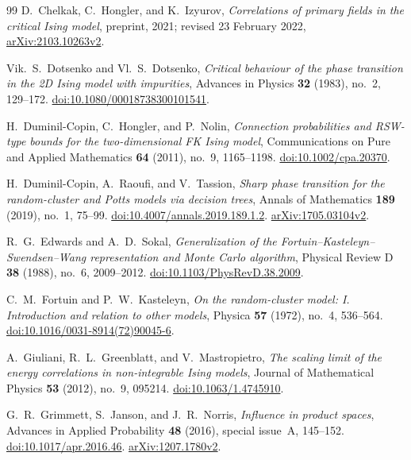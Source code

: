 \begin{thebibliography}{99}
D.~Chelkak, C.~Hongler, and K.~Izyurov,
\emph{Correlations of primary fields in the critical Ising model},
preprint, 2021; revised 23 February 2022,
\href{https://arxiv.org/abs/2103.10263v2}{arXiv:2103.10263v2}.

Vik.~S.~Dotsenko and Vl.~S.~Dotsenko,
\emph{Critical behaviour of the phase transition in the 2D Ising model
with impurities},
Advances in Physics \textbf{32} (1983), no.~2, 129--172.
\href{https://doi.org/10.1080/00018738300101541}{doi:10.1080/00018738300101541}.

H.~Duminil-Copin, C.~Hongler, and P.~Nolin,
\emph{Connection probabilities and RSW-type bounds for the
two-dimensional FK Ising model},
Communications on Pure and Applied Mathematics \textbf{64} (2011),
no.~9, 1165--1198.
\href{https://doi.org/10.1002/cpa.20370}{doi:10.1002/cpa.20370}.

H.~Duminil-Copin, A.~Raoufi, and V.~Tassion,
\emph{Sharp phase transition for the random-cluster and Potts models
via decision trees},
Annals of Mathematics \textbf{189} (2019), no.~1, 75--99.
\href{https://doi.org/10.4007/annals.2019.189.1.2}{doi:10.4007/annals.2019.189.1.2}.
\href{https://arxiv.org/abs/1705.03104v2}{arXiv:1705.03104v2}.

R.~G.~Edwards and A.~D.~Sokal,
\emph{Generalization of the Fortuin--Kasteleyn--Swendsen--Wang
representation and Monte Carlo algorithm},
Physical Review D \textbf{38} (1988), no.~6, 2009--2012.
\href{https://doi.org/10.1103/PhysRevD.38.2009}{doi:10.1103/PhysRevD.38.2009}.

C.~M.~Fortuin and P.~W.~Kasteleyn,
\emph{On the random-cluster model: I. Introduction and relation to other
models},
Physica \textbf{57} (1972), no.~4, 536--564.
\href{https://doi.org/10.1016/0031-8914(72)90045-6}{doi:10.1016/0031-8914(72)90045-6}.

A.~Giuliani, R.~L.~Greenblatt, and V.~Mastropietro,
\emph{The scaling limit of the energy correlations in non-integrable
Ising models},
Journal of Mathematical Physics \textbf{53} (2012), no.~9, 095214.
\href{https://doi.org/10.1063/1.4745910}{doi:10.1063/1.4745910}.

G.~R.~Grimmett, S.~Janson, and J.~R.~Norris,
\emph{Influence in product spaces},
Advances in Applied Probability \textbf{48} (2016), special issue~A,
145--152.
\href{https://doi.org/10.1017/apr.2016.46}{doi:10.1017/apr.2016.46}.
\href{https://arxiv.org/abs/1207.1780v2}{arXiv:1207.1780v2}.


\end{thebibliography}
